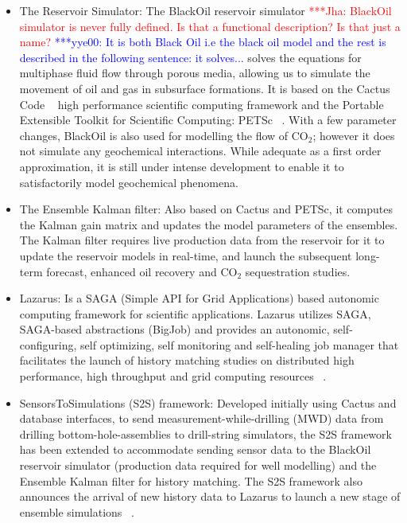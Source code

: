 \documentclass[10pt,conference,final]{IEEEtran}
\newcommand{\jhanote}[1]{ {\textcolor{red} { ***Jha: #1 }}}
\newcommand{\yyenote}[1]{ {\textcolor{blue} { ***yye00: #1 }}}
\newcommand{\jhanote}[1]{}
\newcommand{\yyenote}[1]{}
\begin{document}
\begin{itemize}
\item The Reservoir Simulator: The BlackOil reservoir simulator \jhanote{BlackOil simulator is never fully defined. Is that a functional description? Is that just a name?} \yyenote{It is both Black Oil i.e the black oil model and the rest is described in the following sentence: it solves...} solves the equations for multiphase fluid flow through porous media, allowing us to simulate the movement of oil and gas in subsurface formations. It is based on the Cactus Code ~\cite{cactus_web} high performance scientific computing framework and the Portable Extensible Toolkit for Scientific Computing: PETSc ~\cite{PETSc}. With a few parameter changes, BlackOil is also used for modelling the flow of CO$_2$; however it does not simulate any geochemical interactions. While adequate as a first order approximation, it is still under intense development to enable it to satisfactorily model geochemical phenomena.

\item The Ensemble Kalman filter: Also based on Cactus and PETSc, it computes the Kalman 
gain matrix and updates the model parameters of the ensembles. The Kalman filter requires 
live production data from the reservoir for it to update the reservoir models in 
real-time, and launch the subsequent long-term forecast, enhanced oil recovery and CO$_2$ 
sequestration studies.

\item Lazarus: Is a SAGA (Simple API for Grid Applications) based autonomic computing 
framework for scientific applications. Lazarus utilizes SAGA, SAGA-based 
abstractions (BigJob) and provides an autonomic, self-configuring, self optimizing, self 
monitoring and self-healing job manager that facilitates the launch of history matching 
studies on distributed high performance, high throughput and grid computing resources 
~\cite{gmac}.

\item SensorsToSimulations (S2S) framework: Developed initially using Cactus and database interfaces, to send measurement-while-drilling (MWD) data from drilling bottom-hole-assemblies to drill-string simulators, the S2S framework has been extended to accommodate sending sensor data to the BlackOil reservoir simulator (production data required for well modelling) and the Ensemble Kalman filter for history matching. The S2S framework also announces the arrival of new history data to Lazarus to launch a new stage of ensemble simulations ~\cite{Duff2,Duff1}.

\end{itemize}
\end{document}
